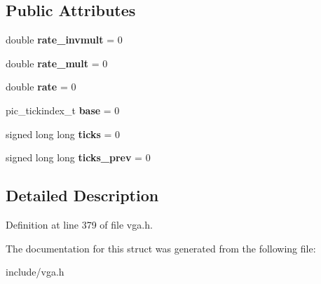 \subsection*{Public Attributes}
\begin{DoxyCompactItemize}
\item 
\hypertarget{structVGA__Experimental__Model__1__t_1_1dotclock__t_a75f26ffd38194b5daae6fdd2990425b4}{double {\bfseries rate\-\_\-invmult} = 0}\label{structVGA__Experimental__Model__1__t_1_1dotclock__t_a75f26ffd38194b5daae6fdd2990425b4}

\item 
\hypertarget{structVGA__Experimental__Model__1__t_1_1dotclock__t_ab588f5f3278883a2ddc7880ff4948501}{double {\bfseries rate\-\_\-mult} = 0}\label{structVGA__Experimental__Model__1__t_1_1dotclock__t_ab588f5f3278883a2ddc7880ff4948501}

\item 
\hypertarget{structVGA__Experimental__Model__1__t_1_1dotclock__t_a7291d8096501aa60f643bdd2bca7898a}{double {\bfseries rate} = 0}\label{structVGA__Experimental__Model__1__t_1_1dotclock__t_a7291d8096501aa60f643bdd2bca7898a}

\item 
\hypertarget{structVGA__Experimental__Model__1__t_1_1dotclock__t_a734e76be051de7ac32062bb02c77d30f}{pic\-\_\-tickindex\-\_\-t {\bfseries base} = 0}\label{structVGA__Experimental__Model__1__t_1_1dotclock__t_a734e76be051de7ac32062bb02c77d30f}

\item 
\hypertarget{structVGA__Experimental__Model__1__t_1_1dotclock__t_adcde33b0ca14be7b9efb097ca7e8c3f9}{signed long long {\bfseries ticks} = 0}\label{structVGA__Experimental__Model__1__t_1_1dotclock__t_adcde33b0ca14be7b9efb097ca7e8c3f9}

\item 
\hypertarget{structVGA__Experimental__Model__1__t_1_1dotclock__t_ab7993f0be605fcd1913088f08dd68c78}{signed long long {\bfseries ticks\-\_\-prev} = 0}\label{structVGA__Experimental__Model__1__t_1_1dotclock__t_ab7993f0be605fcd1913088f08dd68c78}

\end{DoxyCompactItemize}


\subsection{Detailed Description}


Definition at line 379 of file vga.\-h.



The documentation for this struct was generated from the following file\-:\begin{DoxyCompactItemize}
\item 
include/vga.\-h\end{DoxyCompactItemize}
